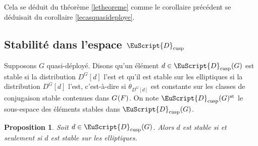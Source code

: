 \documentclass[JEP,XML,SOM,Unicode,francais]{cedram}
\let\mathcal \EuScript
\newcommand{\NoChangel}[1]{%
\expandafter\let\csname old\string#1\endcsname=#1
\let#1=\relax
\newcommand{#1}{\mathcode`l="716C\csname old\string#1\endcsname\mathcode`l="7160 }%
}
\newcommand{\cusp}{\mathrm{cusp}}
\newcommand{\rell}{\mathrm{ell}} \NoChangel{\rell}
\newcommand{\st}{\mathrm{st}}
\newcommand{\cD}{\mathcal{D}}
\theoremstyle{plain}
\newtheorem*{prop*}{Proposition}
\theoremstyle{definition}
\begin{document}
Cela se déduit du théorème \ref{letheoreme} comme le corollaire précédent se déduisait du corollaire \ref{lecasquasideploye}.

\subsection{Stabilité dans l'espace \texorpdfstring{$\cD_{\cusp}$}{Dcusp}}\label{stabilite}
Supposons $G$ quasi-déployé. Disons qu'un élément $d\in \cD_{\cusp}(G)$ est stable si la distribution $D^G[d]$ l'est et qu'il est stable sur les elliptiques si la distribution $D^G[d]$ l'est, c'est-à-dire si $\theta_{D^G[d]}$ est constante sur les classes de conjugaison stable contenues dans $G_{\rell}(F)$. On note $\cD_{\cusp}(G)^{\st}$ le sous-espace des éléments stables dans $\cD_{\cusp}(G)$.

\begin{prop*}
Soit $d\in \cD_{\cusp}(G)$. Alors $d$ est stable si et seulement si $d$ est stable sur les elliptiques.
\end{prop*}
\end{document}
